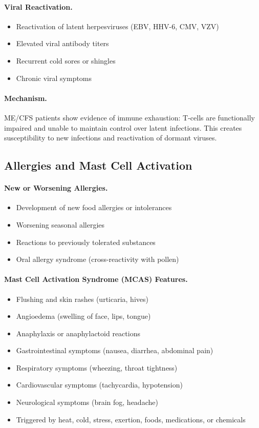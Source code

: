 \paragraph{Viral Reactivation.}
\begin{itemize}
    \item Reactivation of latent herpesviruses (EBV, HHV-6, CMV, VZV)
    \item Elevated viral antibody titers
    \item Recurrent cold sores or shingles
    \item Chronic viral symptoms
\end{itemize}

\paragraph{Mechanism.}
ME/CFS patients show evidence of immune exhaustion: T-cells are functionally impaired and unable to maintain control over latent infections. This creates susceptibility to new infections and reactivation of dormant viruses.

\subsection{Allergies and Mast Cell Activation}
\label{subsec:allergies-mast-cells}

\paragraph{New or Worsening Allergies.}
\begin{itemize}
    \item Development of new food allergies or intolerances
    \item Worsening seasonal allergies
    \item Reactions to previously tolerated substances
    \item Oral allergy syndrome (cross-reactivity with pollen)
\end{itemize}

\paragraph{Mast Cell Activation Syndrome (MCAS) Features.}
\begin{itemize}
    \item Flushing and skin rashes (urticaria, hives)
    \item Angioedema (swelling of face, lips, tongue)
    \item Anaphy\-laxis or anaphy\-lactoid reactions
    \item Gastrointestinal symptoms (nausea, diarrhea, abdominal pain)
    \item Respiratory symptoms (wheezing, throat tightness)
    \item Cardiovascular symptoms (tachycardia, hypotension)
    \item Neurological symptoms (brain fog, headache)
    \item Triggered by heat, cold, stress, exertion, foods, medications, or chemicals
\end{itemize}

